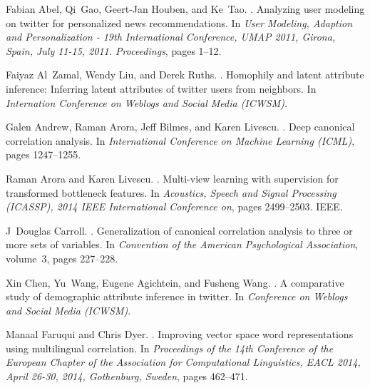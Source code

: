 \documentclass{article}
\begin{document}
\begin{thebibliography}{}

Fabian Abel, Qi~Gao, Geert{-}Jan Houben, and Ke~Tao.
.
\newblock Analyzing user modeling on twitter for personalized news
  recommendations.
\newblock In {\em User Modeling, Adaption and Personalization - 19th
  International Conference, {UMAP} 2011, Girona, Spain, July 11-15, 2011.
  Proceedings}, pages 1--12.

Faiyaz Al~Zamal, Wendy Liu, and Derek Ruths.
.
\newblock Homophily and latent attribute inference: Inferring latent attributes
  of twitter users from neighbors.
\newblock In {\em Internation Conference on Weblogs and Social Media (ICWSM)}.

Galen Andrew, Raman Arora, Jeff Bilmes, and Karen Livescu.
.
\newblock Deep canonical correlation analysis.
\newblock In {\em International Conference on Machine Learning (ICML)}, pages
  1247--1255.

Raman Arora and Karen Livescu.
.
\newblock Multi-view learning with supervision for transformed bottleneck
  features.
\newblock In {\em Acoustics, Speech and Signal Processing (ICASSP), 2014 IEEE
  International Conference on}, pages 2499--2503. IEEE.

J~Douglas Carroll.
.
\newblock Generalization of canonical correlation analysis to three or more
  sets of variables.
\newblock In {\em Convention of the American Psychological Association},
  volume~3, pages 227--228.

Xin Chen, Yu~Wang, Eugene Agichtein, and Fusheng Wang.
.
\newblock A comparative study of demographic attribute inference in twitter.
\newblock In {\em Conference on Weblogs and Social Media (ICWSM)}.

Manaal Faruqui and Chris Dyer.
.
\newblock Improving vector space word representations using multilingual
  correlation.
\newblock In {\em Proceedings of the 14th Conference of the European Chapter of
  the Association for Computational Linguistics, {EACL} 2014, April 26-30,
  2014, Gothenburg, Sweden}, pages 462--471.


\end{thebibliography}
\end{document}

